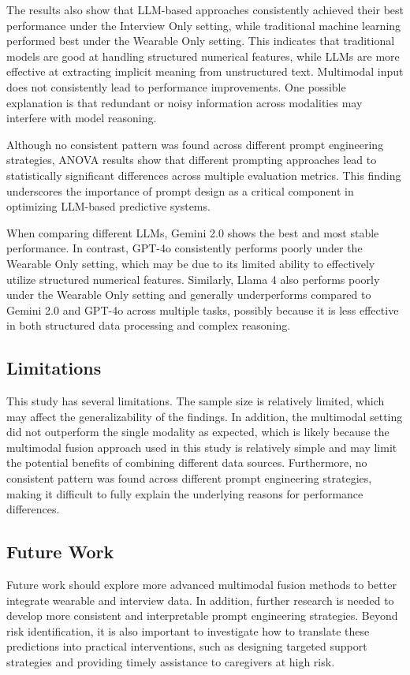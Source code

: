 \documentclass[letterpaper, 10 pt, conference]{ieeeconf}  %
\begin{document}
The results also show that LLM-based approaches consistently achieved their best performance under the Interview Only setting, while traditional machine learning performed best under the Wearable Only setting. This indicates that traditional models are good at handling structured numerical features, while LLMs are more effective at extracting implicit meaning from unstructured text. Multimodal input does not consistently lead to performance improvements. One possible explanation is that redundant or noisy information across modalities may interfere with model reasoning.

Although no consistent pattern was found across different prompt engineering strategies, ANOVA results show that different prompting approaches lead to statistically significant differences across multiple evaluation metrics. This finding underscores the importance of prompt design as a critical component in optimizing LLM-based predictive systems.

When comparing different LLMs, Gemini 2.0 shows the best and most stable performance. In contrast, GPT-4o consistently performs poorly under the Wearable Only setting, which may be due to its limited ability to effectively utilize structured numerical features. Similarly, Llama 4 also performs poorly under the Wearable Only setting and generally underperforms compared to Gemini 2.0 and GPT-4o across multiple tasks, possibly because it is less effective in both structured data processing and complex reasoning.

\subsection{Limitations}
This study has several limitations. The sample size is relatively limited, which may affect the generalizability of the findings. In addition, the multimodal setting did not outperform the single modality as expected, which is likely because the multimodal fusion approach used in this study is relatively simple and may limit the potential benefits of combining different data sources. Furthermore, no consistent pattern was found across different prompt engineering strategies, making it difficult to fully explain the underlying reasons for performance differences.

\subsection{Future Work}
Future work should explore more advanced multimodal fusion methods to better integrate wearable and interview data. In addition, further research is needed to develop more consistent and interpretable prompt engineering strategies. Beyond risk identification, it is also important to investigate how to translate these predictions into practical interventions, such as designing targeted support strategies and providing timely assistance to caregivers at high risk.
\end{document}

